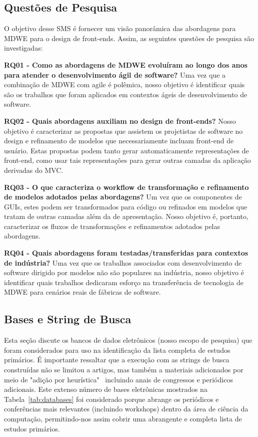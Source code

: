 \subsection{Questões de Pesquisa}

O objetivo desse SMS é fornecer um visão panorâmica das abordagens para MDWE para o design de front-ends. Assim, as seguintes questões de pesquisa são investigadas:

\textbf{RQ01 - Como as abordagens de MDWE evoluíram ao longo dos anos para atender o desenvolvimento ágil de software?} Uma vez que a combinação de MDWE com agile é polêmica, nosso objetivo é identificar quais são os trabalhos que foram aplicados em contextos ágeis de desenvolvimento de software.

\textbf{RQ02 - Quais abordagens auxiliam no design de front-ends?} Nosso objetivo é caracterizar as propostas que assistem os projetistas de software no design e refinamento de modelos que necessariamente incluam front-end de usuário. Estas propostas podem tanto gerar automaticamente representações de front-end, como usar tais representações para gerar outras camadas da aplicação derivadas do MVC.

\textbf{RQ03 - O que caracteriza o workflow de transformação e refinamento de modelos adotados pelas abordagens?} Um vez que os componentes de GUIs, estes podem ser transformados para código ou refinados em modelos que tratam de outras camadas além da de apresentação. Nosso objetivo é, portanto, caracterizar os fluxos de transformações e refinamentos adotados pelas abordagens.

\textbf{RQ04 - Quais abordagens foram testadas/transferidas para contextos de indústria?} Uma vez que os trabalhos associados com desenvolvimento de software dirigido por modelos não são populares na indústria, nosso objetivo é identificar quais trabalhos dedicaram esforço na transferência de tecnologia de MDWE para cenários reais de fábricas de software.

\subsection{Bases e String de Busca}


Esta seção discute os bancos de dados eletrônicos (nosso escopo de pesquisa) que foram considerados para uso na identificação da lista completa de estudos primários. É importante ressaltar que a execução com as strings de busca construídas não se limitou a artigos, mas também a materiais adicionados por meio de "adição por heurística"~\cite{Kitchenham07} incluindo anais de congressos e periódicos adicionais. Este extenso número de bases eletrônicas mostrados na Tabela~\ref{tab:databases} foi considerado porque abrange os periódicos e conferências mais relevantes (incluindo workshops) dentro da área de ciência da computação, permitindo-nos assim cobrir uma abrangente e completa lista de estudos primários.


